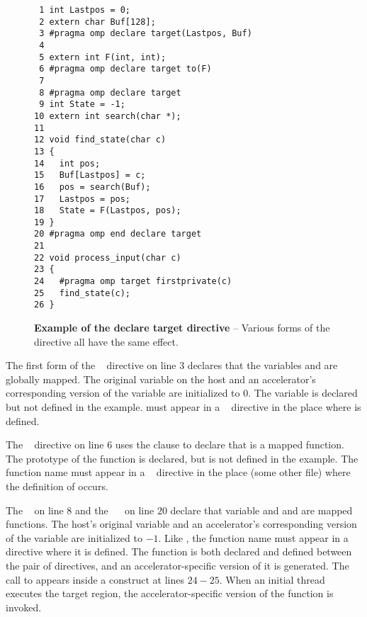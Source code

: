 \begin{figure*}[!tb]
\begin{verbatim}
 1 int Lastpos = 0;
 2 extern char Buf[128];
 3 #pragma omp declare target(Lastpos, Buf)
 4 
 5 extern int F(int, int);
 6 #pragma omp declare target to(F)
 7 
 8 #pragma omp declare target
 9 int State = -1;
10 extern int search(char *);
11 
12 void find_state(char c)
13 {
14   int pos;
15   Buf[Lastpos] = c;
16   pos = search(Buf);
17   Lastpos = pos;
18   State = F(Lastpos, pos);
19 }
20 #pragma omp end declare target
21 
22 void process_input(char c)
23 {
24   #pragma omp target firstprivate(c)
25   find_state(c);
26 }
\end{verbatim}
\caption{ \textbf {Example of the declare target directive} -- \small
          Various forms of the directive all have the same effect.
         }
\label{figure:chapter6-decltarg}
\end{figure*}

The first form of the ~ directive on line $3$
declares that the variables  and  are globally mapped.  The
original  variable on the host and an accelerator's corresponding
version of the variable are initialized to $0$.  The variable  is declared
but not defined in the example.   must appear in a
~ directive in the place where  is defined.

The ~ directive on line $6$ uses the 
clause to declare that  is a mapped function.  The prototype
of the function  is declared, but  is not defined in the example.  The
function name  must appear in a ~ directive in
the place (some other file) where the definition of  occurs.

The ~ on line $8$ and the
~~ on line $20$ declare that variable
 and  and  are mapped functions.  The
host's original variable  and an accelerator's corresponding version of
the variable are initialized to $-1$.  Like , the function name 
must appear in a ~ directive where it is defined.
The function  is both declared and defined between the pair of
directives, and an accelerator-specific version of it is generated.  The call to
 appears inside a  construct at lines $24-25$.  When
an initial thread executes the target region, the accelerator-specific version of the
 function is invoked.

